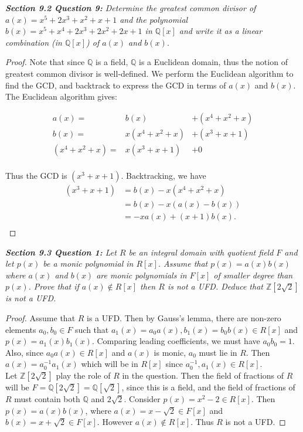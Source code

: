 \documentclass{article}
\begin{document}
\it \textbf{Section 9.2 Question 9:} Determine the greatest common divisor
  of $a(x)=x^5+2x^3+x^2+x+1$ and the polynomial
  $b(x)=x^5+x^4+2x^3+2x^2+2x+1$ in $\mathbb{Q}[x]$ and write it as a linear
  combination (in $\mathbb{Q}[x]$) of $a(x)$ and $b(x)$.

  \begin{proof}
    Note that since $\mathbb{Q}$ is a field, $\mathbb{Q}$ is a Euclidean
    domain, thus the notion of greatest common divisor is well-defined. We
    perform the Euclidean algorithm to find the GCD,
    and backtrack to express the GCD in terms of $a(x)$ and $b(x)$. The
    Euclidean algorithm gives:

    \[\begin{array}{rll}
      a(x)= &b(x) &+(x^4+x^2+x) \\
      b(x)= &x(x^4+x^2+x) &+(x^3+x+1) \\
      (x^4+x^2+x)= &x(x^3+x+1) &+0 \\
    \end{array}\]

    Thus the GCD is $(x^3+x+1)$. Backtracking, we have
    \begin{align*}
      (x^3+x+1) &=b(x)-x(x^4+x^2+x) \\
      &=b(x)-x(a(x)-b(x)) \\
      &=-xa(x)+(x+1)b(x). \\
    \end{align*}
  \end{proof}

\it \textbf{Section 9.3 Question 1:} Let $R$ be an integral domain with
  quotient field $F$ and let $p(x)$ be a monic polynomial in $R[x]$. Assume
  that $p(x)=a(x)b(x)$ where $a(x)$ and $b(x)$ are monic polynomials in
  $F[x]$ of smaller degree than $p(x)$. Prove that if $a(x)\not\in R[x]$
  then $R$ is not a UFD. Deduce that $\mathbb{Z}[2\sqrt{2}]$ is not a UFD.

  \begin{proof}
    Assume that $R$ is a UFD. Then by Gauss's lemma, there are non-zero
    elements $a_0,b_0\in F$ such that $a_1(x)=a_0a(x),b_1(x)=b_0b(x)\in
    R[x]$ and $p(x)=a_1(x)b_1(x)$. Comparing leading coefficients, we must
    have $a_0b_0=1$. Also, since $a_0a(x)\in R[x]$ and $a(x)$ is monic,
    $a_0$ must lie in $R$. Then $a(x)=a_0^{-1}a_1(x)$ which will be in
    $R[x]$ since $a_0^{-1},a_1(x)\in R[x]$. \\

    Let $\mathbb{Z}[2\sqrt{2}]$ play the role of $R$ in the question. Then
    the field of fractions of $R$ will be
    $F=\mathbb{Q}[2\sqrt{2}]=\mathbb{Q}[\sqrt{2}]$, since this is a field,
    and the field of fractions of $R$ must contain both $\mathbb{Q}$ and
    $2\sqrt{2}$. Consider $p(x)=x^2-2\in R[x]$. Then $p(x)=a(x)b(x)$, where
    $a(x)=x-\sqrt{2}\in F[x]$ and $b(x)=x+\sqrt{2}\in F[x]$. However
    $a(x)\not\in R[x]$. Thus $R$ is not a UFD.
  \end{proof}
\end{document}

